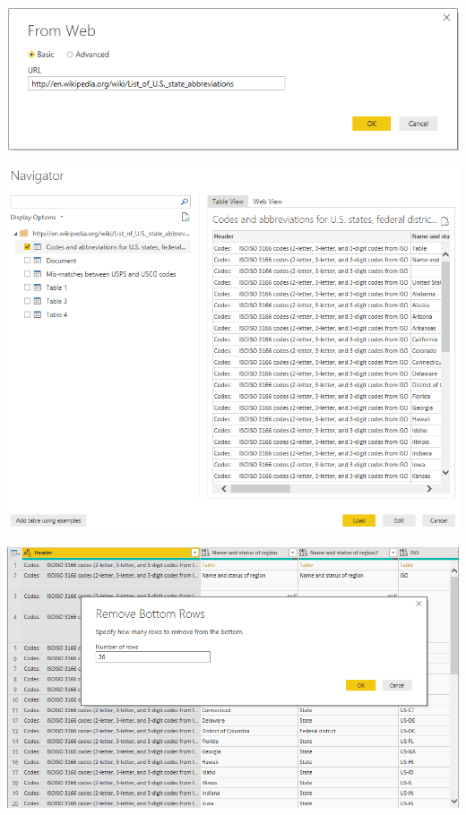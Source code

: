 	\begin{center}
	\includegraphics[width=15cm]{./Imagenes/power15}
	\end{center}	

	\begin{center}
	\includegraphics[width=15cm]{./Imagenes/power16}
	\end{center}	

	\begin{center}
	\includegraphics[width=15cm]{./Imagenes/power17}
	\end{center}	

